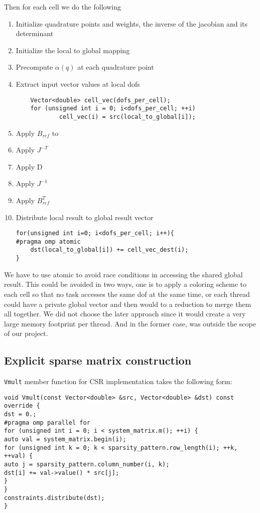 \documentclass[12pt]{article}
\begin{document}
Then for each cell we do the following
\begin{enumerate}
\item Initialize quadrature points and weights, the inverse of the jacobian and its determinant
\item Initialize the local to global mapping
\item Precompute $\alpha(q)$ at each quadrature point
\item Extract input vector values at local dofs
\begin{lstlisting}
	Vector<double> cell_vec(dofs_per_cell);
	for (unsigned int i = 0; i<dofs_per_cell; ++i)
			cell_vec(i) = src(local_to_global[i]);
\end{lstlisting}
\item Apply $B_{ref}$ to 
\item Apply $J^{-T}$
\item Apply D
\item Apply $J^{-1}$
\item Apply $B^{T}_{ref}$
\item Distribute local result to global result vector
\begin{lstlisting}
for(unsigned int i=0; i<dofs_per_cell; i++){
#pragma omp atomic
	dst(local_to_global[i]) += cell_vec_dest(i);
}
\end{lstlisting}
\end{enumerate}
We have to use atomic to avoid race conditions in accessing the shared global result. This could be avoided in two ways, one is to apply a coloring scheme to each cell so that no task accesses the same dof at the same time, or each thread could have a private global vector and then would to a reduction to merge them all together. We did not choose the later approach since it would create a very large memory footprint per thread. And in the former case, was outside the scope of our project.

\subsection{Explicit sparse matrix construction}

\texttt{Vmult} member function for CSR implementation takes the following form: 
\begin{lstlisting}[caption={CRS matrix multiplication with row-wise parallelization},captionpos=b]
void Vmult(const Vector<double> &src, Vector<double> &dst) const override {
dst = 0.;
#pragma omp parallel for
for (unsigned int i = 0; i < system_matrix.m(); ++i) {
auto val = system_matrix.begin(i);
for (unsigned int k = 0; k < sparsity_pattern.row_length(i); ++k, ++val) {
auto j = sparsity_pattern.column_number(i, k);
dst[i] += val->value() * src[j];
}
}
constraints.distribute(dst);
}
\end{lstlisting}
\end{document}
